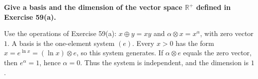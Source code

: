 \providecommand{\rank}{\operatorname{r}}
\providecommand{\RR}{\mathbb R}
\providecommand{\CC}{\mathbb C}
\providecommand{\KK}{\mathbb K}

\setcounter{enumi}{87}
\item {\bfseries\boldmath
Give a basis and the dimension of the vector space $\RR^+$ defined in Exercise 59(a).
}

\begin{answer}
Use the operations of Exercise 59(a): $x\oplus y=xy$ and
$\alpha\otimes x=x^\alpha$, with zero vector $1$.
A basis is the one-element system $(e)$.
Every $x>0$ has the form $x=e^{\ln x}=(\ln x)\otimes e$, so this system generates.
If $\alpha\otimes e$ equals the zero vector, then $e^\alpha=1$, hence
$\alpha=0$. Thus the system is independent, and the dimension is $1$.
\end{answer}
